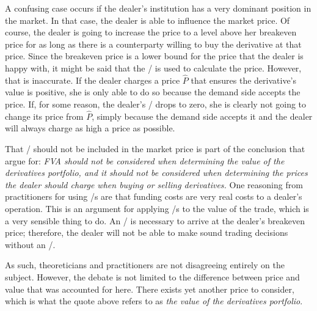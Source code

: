 \documentclass[main.tex]{subfiles}
\begin{document}
    A confusing case occurs if the dealer's institution has a very dominant position in the market.
    In that case, the dealer is able to influence the market price.
    Of course, the dealer is going to increase the price to a level above her breakeven price
    for as long as there is a counterparty willing to buy the derivative at that price.
    Since the breakeven price is a lower bound for the price that the dealer is happy with,
    it might be said that the \FVA/ is used to calculate the price.
    However, that is inaccurate. 
    If the dealer charges a price $\hat{P}$ that ensures the derivative's value is positive,
    she is only able to do so because the demand side accepts the price.
    If, for some reason, the dealer's \FVA/ drops to zero,
    she is clearly not going to change its price from $\hat{P}$,
    simply because the demand side accepts it 
    and the dealer will always charge as high a price as possible.

    That \FVA/ should not be included in the market price 
    is part of the conclusion that \textcite{HullWhite2012FVA} argue for: 
    \textit{
        FVA should not be considered when determining the value of the 
        derivatives portfolio, and it should not be considered when determining the prices 
        the dealer should charge when buying or selling derivatives.
    }
    One reasoning from practitioners for using \FVA/s are 
    that funding costs are very real costs to a dealer's operation.
    This is an argument for applying \FVA/s to the value of the trade,
    which is a very sensible thing to do.
    An \FVA/ is necessary to arrive at the dealer's breakeven price;
    therefore, the dealer will not be able to make sound trading decisions without an \FVA/.
    
    As such, theoreticians and practitioners are not disagreeing entirely on the subject.
    However, the debate is not limited to the difference between price and value
    that was accounted for here. 
    There exists yet another price to consider, which is what the quote above 
    refers to as \textit{the value of the derivatives portfolio}.
\end{document}
